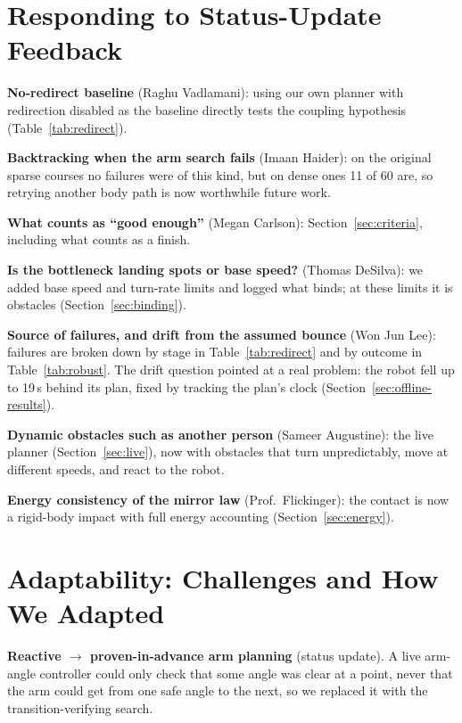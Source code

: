 \documentclass[10pt,twocolumn]{article}
\begin{document}
\section{Responding to Status-Update Feedback}
\textbf{No-redirect baseline} (Raghu Vadlamani): using our own planner with
redirection disabled as the baseline directly tests the coupling
hypothesis (Table~\ref{tab:redirect}).

\textbf{Backtracking when the arm search fails} (Imaan Haider): on the
original sparse courses no failures were of this kind, but on dense ones
11 of 60 are, so retrying another body path is now worthwhile future work.

\textbf{What counts as ``good enough''} (Megan Carlson):
Section~\ref{sec:criteria}, including what counts as a finish.

\textbf{Is the bottleneck landing spots or base speed?} (Thomas DeSilva):
we added base speed and turn-rate limits and logged what binds; at these
limits it is obstacles (Section~\ref{sec:binding}).

\textbf{Source of failures, and drift from the assumed bounce} (Won Jun
Lee): failures are broken down by stage in Table~\ref{tab:redirect} and by
outcome in Table~\ref{tab:robust}. The drift question pointed at a real
problem: the robot fell up to 19\,s behind its plan, fixed by tracking the
plan's clock (Section~\ref{sec:offline-results}).

\textbf{Dynamic obstacles such as another person} (Sameer Augustine): the
live planner (Section~\ref{sec:live}), now with obstacles that turn
unpredictably, move at different speeds, and react to the robot.

\textbf{Energy consistency of the mirror law} (Prof.\ Flickinger): the
contact is now a rigid-body impact with full energy accounting
(Section~\ref{sec:energy}).

\section{Adaptability: Challenges and How We Adapted}
\textbf{Reactive $\rightarrow$ proven-in-advance arm planning}
(status update). A live arm-angle controller could only check that some
angle was clear at a point, never that the arm could get from one safe
angle to the next, so we replaced it with the transition-verifying search.
\end{document}
